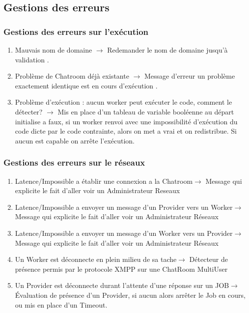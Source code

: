 \documentclass[11pt]{article}
\begin{document}
\newpage
\subsection{Gestions des erreurs}

\subsubsection{Gestions des erreurs sur l\textquoteright exécution}
\begin{enumerate}
\item Mauvais nom de domaine $ \rightarrow $ Redemander le nom de domaine jusqu'à validation .
\item Problème de Chatroom déjà existante $\rightarrow$ Message d'erreur un problème exactement identique est en cours d'exécution .
\item Problème d'exécution : aucun worker peut exécuter le code, comment le détecter? $\rightarrow$ Mis en place d'un tableau de variable booléenne au départ initialise a faux, si un worker renvoi avec une impossibilité d\textquoteright exécution du code dicte par le code contrainte, alors on met a vrai et on redistribue. Si aucun est capable on arrête l\textquoteright exécution.
\end{enumerate}  
\subsubsection{Gestions des erreurs sur le réseaux}
\begin{enumerate}
\item Latence/Impossible a établir une  connexion a la Chatroom$ \rightarrow $ Message qui explicite le fait d'aller voir un Administrateur Reseaux
\item Latence/Impossible a envoyer un  message d'un Provider vers un Worker$ \rightarrow $ Message qui explicite le fait d'aller voir un Administrateur Réseaux
\item Latence/Impossible a envoyer un  message d'un Worker vers un Provider$ \rightarrow $ Message qui explicite le fait d'aller voir un Administrateur Réseaux 
\item Un Worker est déconnecte en plein milieu de sa tache$ \rightarrow $ Détecteur de présence permis par le protocole XMPP sur une ChatRoom MultiUser
\item Un Provider est déconnecte durant l'attente d'une réponse sur un JOB$ \rightarrow $ Évaluation de présence d'un Provider, si aucun alors arrêter le Job en cours, ou mis en place d'un Timeout.
\end{enumerate}
\end{document}

